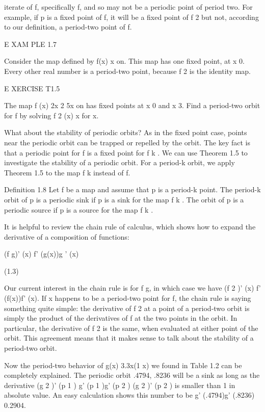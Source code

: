 \documentclass[12pt]{article}
\begin{document}
iterate of f, specifically f, and so may not be a periodic point of period two. For example, if p is a 
fixed point of f, it will be a fixed point of f 2 but not, according to our definition, a period-two point 
of f.

E XAM PLE 1.7

Consider the map defined by f(x)  x on. This map has one fixed point, at x  0. Every other real number is a 
period-two point, because f 2 is the identity map.

 

E XERCISE T1.5

The map f (x)  2x 2  5x on has fixed points at x  0 and x  3. Find a period-two orbit for f by solving f 2 
(x)  x for x.

What about the stability of periodic orbits? As in the fixed point case, points near the periodic orbit can 
be trapped or repelled by the orbit. The key fact is that a periodic point for f is a fixed point for f k . 
We can use Theorem 1.5 to investigate the stability of a periodic orbit. For a period-k orbit, we apply 
Theorem 1.5 to the map f k instead of f.


Definition 1.8 Let f be a map and assume that p is a period-k point. The period-k orbit of p is a periodic 
sink if p is a sink for the map f k . The orbit of p is a periodic source if p is a source for the map f k 
.

It is helpful to review the chain rule of calculus, which shows how to expand the derivative of a 
composition of functions:

(f   g)' (x)  f' (g(x))g ' (x)

(1.3)

Our current interest in the chain rule is for f  g, in which case we have (f 2 )' (x)  f' (f(x))f' (x). If 
x happens to be a period-two point for f, the chain rule is saying something quite simple: the derivative 
of f 2 at a point of a period-two orbit is simply the product of the derivatives of f at the two points in 
the orbit. In particular, the derivative of f 2 is the same, when evaluated at either point of the orbit. 
This agreement means that it makes sense to talk about the stability of a period-two orbit.

Now the period-two behavior of g(x)  3.3x(1  x) we found in Table 1.2 can be completely explained. The 
periodic orbit .4794, .8236  will be a sink as long as the derivative (g 2 )' (p 1 )  g' (p 1 )g' (p 2 )  
(g 2 )' (p 2 ) is smaller than 1 in absolute value. An easy calculation shows this number to be g' 
(.4794)g' (.8236)  0.2904.
\end{document}
